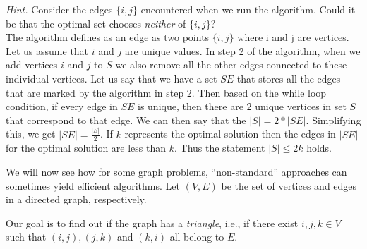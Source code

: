 \documentclass[addpoints, 11pt]{exam}
\begin{document}
\begin{questions}

  {\em Hint.} Consider the edges $\{i,j\}$ encountered when we run the algorithm. Could it be that the optimal set chooses {\em neither} of $\{i,j\}$? \\
  The algorithm defines as an edge as two points $\{i, j\}$ where i and j are vertices. Let us assume that $i$ and $j$ are unique values. In step 2 of the algorithm,
  when we add vertices $i$ and $j$ to $S$ we also remove all the other edges connected to these individual vertices. Let us say that we have a set $SE$ that stores all the edges that are
  marked by the algorithm in step 2. Then based on the while loop condition, if every edge in $SE$ is unique, then there are 2 unique vertices in set $S$ that correspond to that edge.
  We can then say that the $|S| = 2 * |SE|$. Simplifying this, we get $|SE| = \frac{|S|}{2}$. If $k$ represents the optimal solution then the edges in $|SE|$ for the optimal solution are less than $k$.
  Thus the statement $|S| \le 2k$ holds.


  We will now see how for some graph problems, ``non-standard'' approaches can sometimes yield efficient algorithms. Let $(V, E)$ be the set of vertices and edges in a directed graph, respectively.

  Our goal is to find out if the graph has a {\em triangle}, i.e., if there exist $i,j, k \in V$ such that $(i,j), (j,k)$ and $(k,i)$ all belong to $E$.
  \begin{parts}

\end{parts}
\end{questions}
\end{document}
